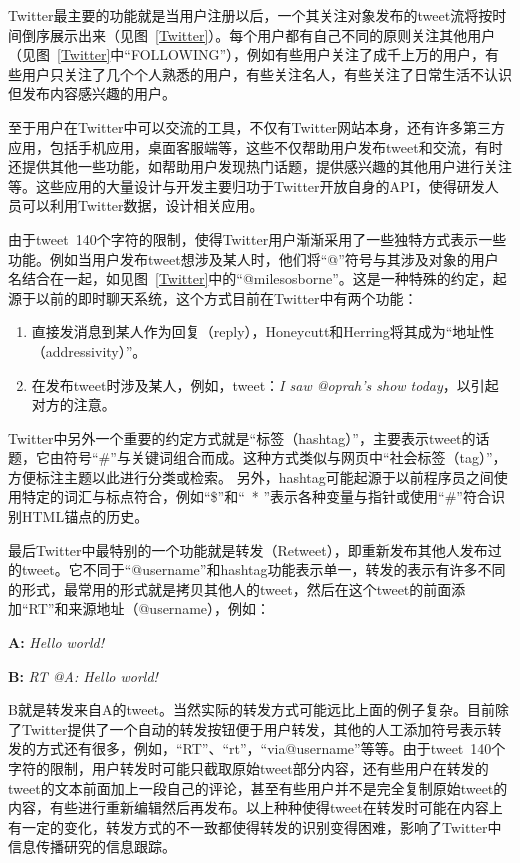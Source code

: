 Twitter最主要的功能就是当用户注册以后，一个其关注对象发布的tweet流将按时间倒序展示出来（见图~\ref{Twitter}）。每个用户都有自己不同的原则关注其他用户（见图~\ref{Twitter}中“FOLLOWING”），例如有些用户关注了成千上万的用户，有些用户只关注了几个个人熟悉的用户，有些关注名人，有些关注了日常生活不认识但发布内容感兴趣的用户。

至于用户在Twitter中可以交流的工具，不仅有Twitter网站本身，还有许多第三方应用，包括手机应用，桌面客服端等，这些不仅帮助用户发布tweet和交流，有时还提供其他一些功能，如帮助用户发现热门话题，提供感兴趣的其他用户进行关注等。这些应用的大量设计与开发主要归功于Twitter开放自身的API，使得研发人员可以利用Twitter数据，设计相关应用。

由于tweet~140个字符的限制，使得Twitter用户渐渐采用了一些独特方式表示一些功能。例如当用户发布tweet想涉及某人时，他们将“@”符号与其涉及对象的用户名结合在一起，如见图~\ref{Twitter}中的“@milesosborne”。这是一种特殊的约定，起源于以前的即时聊天系统，这个方式目前在Twitter中有两个功能：
   \begin{enumerate}
    \item 直接发消息到某人作为回复（reply），Honeycutt和Herring将其成为“地址性（addressivity）”。
    \item 在发布tweet时涉及某人，例如，tweet：\emph{I saw @oprah's show today}，以引起对方的注意。
  \end{enumerate}  

Twitter中另外一个重要的约定方式就是“标签（hashtag）”，主要表示tweet的话题，它由符号“\#”与关键词组合而成。这种方式类似与网页中“社会标签（tag）”，方便标注主题以此进行分类或检索。 另外，hashtag可能起源于以前程序员之间使用特定的词汇与标点符合，例如“\$”和“\ * ”表示各种变量与指针或使用“\#”符合识别HTML锚点的历史。

最后Twitter中最特别的一个功能就是转发（Retweet），即重新发布其他人发布过的tweet。它不同于“@username”和hashtag功能表示单一，转发的表示有许多不同的形式，最常用的形式就是拷贝其他人的tweet，然后在这个tweet的前面添加“RT”和来源地址（@username），例如：
 \begin{description}
    \item \textbf{A:} \emph{Hello world!}
    \item \textbf{B:} \emph{RT @A: Hello world!}
  \end{description}  
B就是转发来自A的tweet。当然实际的转发方式可能远比上面的例子复杂。目前除了Twitter提供了一个自动的转发按钮便于用户转发，其他的人工添加符号表示转发的方式还有很多，例如，“RT”、“rt”，“via@username”等等。由于tweet~140个字符的限制，用户转发时可能只截取原始tweet部分内容，还有些用户在转发的tweet的文本前面加上一段自己的评论，甚至有些用户并不是完全复制原始tweet的内容，有些进行重新编辑然后再发布。以上种种使得tweet在转发时可能在内容上有一定的变化，转发方式的不一致都使得转发的识别变得困难，影响了Twitter中信息传播研究的信息跟踪。

